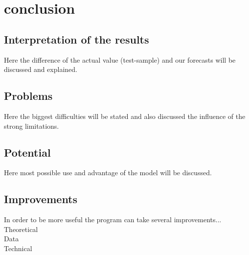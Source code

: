 \documentclass {article}
\begin{document}
\newpage
\section{conclusion}
\subsection{Interpretation of the results}
Here the difference of the actual value (test-sample) and our forecasts will be discussed and explained.
\subsection{Problems}
Here the biggest difficulties will be stated and also discussed the influence of the strong limitations.
\subsection{Potential}
Here most possible use and advantage of the model will be discussed.
\subsection{Improvements}
In order to be more useful the program can take several improvements...\\
Theoretical\\
Data\\
Technical
\end{document}
